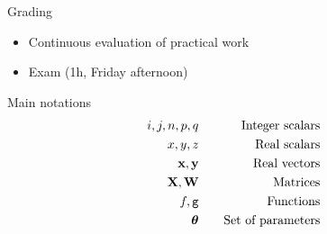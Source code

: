 \documentclass[xcolor=pdftex,dvipsnames,table,mathserif]{beamer}
\begin{document}
\begin{frame}{Grading}

\begin{itemize}
\item Continuous evaluation of practical work
\item Exam (1h, Friday afternoon)
\end{itemize}

\end{frame}

\begin{frame}{Main notations}
  \begin{eqnarray*}
    i, j, n, p, q & \hspace{1em} & \text{Integer scalars} \\
    x, y, z & \hspace{1em} & \text{Real scalars} \\
    \mathbf{x}, \mathbf{y} & \hspace{1em} & \text{Real vectors} \\
    \mathbf{X}, \mathbf{W} & \hspace{1em} & \text{Matrices} \\
    f, \texttt{g} & \hspace{1em} & \text{Functions} \\
    \boldsymbol{\theta} & \hspace{1em} & \text{Set of parameters} \\
    \end{eqnarray*}
\end{frame}











\end{document}
